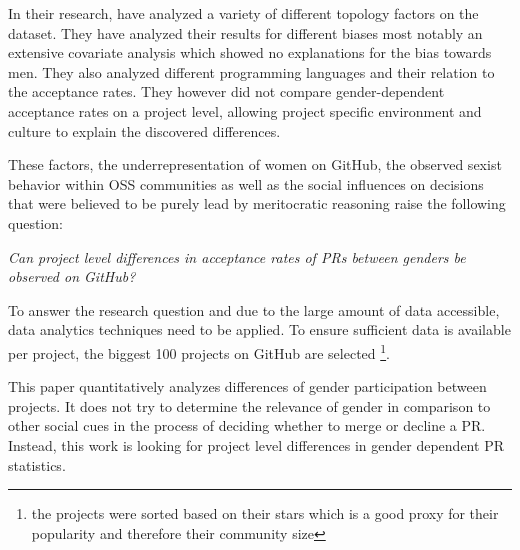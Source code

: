 In their research, \citeauthor{genderdiff:2016} have analyzed a variety of different topology factors on the dataset. They have analyzed their results for different biases most notably an extensive covariate analysis which showed no explanations for the bias towards men. They also analyzed different programming languages and their relation to the acceptance rates. They however did not compare gender-dependent acceptance rates on a project level, allowing project specific environment and culture to explain the discovered differences.

These factors, the underrepresentation of women on GitHub, the observed sexist behavior within \ac{OSS} communities as well as the social influences on decisions that were believed to be purely lead by meritocratic reasoning raise the following question:%

\emph{Can project level differences in acceptance rates of \ac{PR}s between genders be observed on GitHub?}


To answer the research question and due to the large amount of data accessible, data analytics techniques need to be applied. To ensure sufficient data is available per project, the biggest 100 projects on GitHub are selected
\footnote{the projects were sorted based on their stars which is a good proxy for their popularity and therefore their community size}.

This paper quantitatively analyzes differences of gender participation between projects. It does not try to determine the relevance of gender in comparison to other social cues in the process of deciding whether to merge or decline a \ac{PR}. Instead, this work is looking for project level differences in gender dependent \ac{PR} statistics. %

